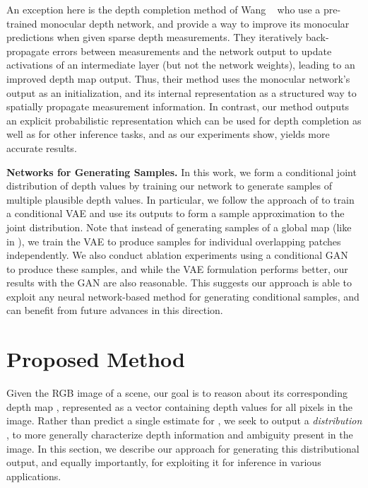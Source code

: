 \documentclass[10pt,twocolumn,letterpaper]{article}
\begin{document}
An exception here is the depth completion method of Wang \etal~\cite{wang2019plug} who use a pre-trained monocular depth network, and provide a way to improve its monocular predictions when given sparse depth measurements. They iteratively back-propagate errors between measurements and the network output to update activations of an intermediate layer (but not the network weights), leading to an improved depth map output. Thus, their method uses the monocular network's output as an initialization, and its internal representation as a structured way to spatially propagate measurement information. In contrast, our method outputs an explicit probabilistic representation which can be used for depth completion as well as for other inference tasks, and as our experiments show, yields more accurate results.

\noindent\textbf{Networks for Generating Samples.} In this work, we form a conditional joint distribution of depth values by training our network to generate samples of multiple plausible depth values. In particular, we follow the approach of \cite{condVAE} to train a conditional VAE and use its outputs to form a sample approximation to the joint distribution. Note that instead of generating samples of a global map (like in \cite{condVAE}), we train the VAE to produce samples for individual overlapping patches independently. We also conduct ablation experiments using a conditional GAN~\cite{goodfellow2014generative,mirza2014conditional} to produce these samples, and while the VAE formulation performs better, our results with the GAN are also reasonable. This suggests our approach is able to exploit any neural network-based method for generating conditional samples, and can benefit from future advances in this direction.

\newcommand{\paras}[1]{\noindent\textbf{#1}}
\renewcommand{\Phi}{\mathcal{S}}
\newcommand{\crop}{\mathcal{P}_i}
\newcommand{\patch}{\mathbf{x}}
\newcommand{\Z}{\mathbf{Z}}
\newcommand{\I}{\mathbf{I}}
\newcommand{\A}{\mathbf{A}}


\section{Proposed Method}
\label{sec:net}

Given the RGB image  of a scene, our goal is to reason about its corresponding depth map , represented as a vector containing depth values for all  pixels in the image. Rather than predict a single estimate for , we seek to output a \emph{distribution} , to more generally characterize depth information and ambiguity present in the image. In this section, we describe our approach for generating this distributional output, and equally importantly, for exploiting it for inference in various applications.
\end{document}
